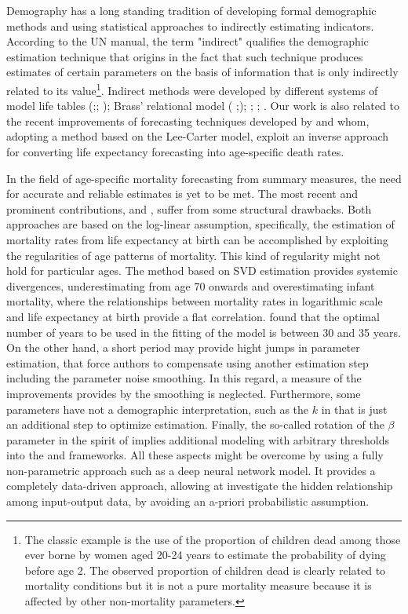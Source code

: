 \documentclass[a4,11pt]{article}
\begin{document}
Demography has a long standing tradition of developing formal demographic methods and using statistical approaches to indirectly estimating indicators. According to the UN manual, the term "indirect" qualifies the demographic estimation technique that origins in the fact that such technique produces estimates of certain parameters on the basis of information that is only indirectly related to its value\footnote{The classic example is the use of the proportion of children dead among those ever borne by women aged 20-24 years to estimate the probability of dying before age 2. The observed proportion of children dead is clearly related to mortality conditions but it is not a pure mortality measure because it is affected by other non-mortality parameters.}. 
Indirect methods were developed by different systems of model life tables (\cite{UN_1955};\cite{UN_1967}; \cite{sullivan1972}); Brass’ relational model ( \cite{brass1968};\cite{brass1971}); \cite{murray2003};  \cite{wilmoth2012}; \cite{mayhew2013}.
Our work is also related to the recent improvements of forecasting techniques developed by \cite{Sevcikova} and  \cite{PascariuLL} whom, adopting a method based on the Lee-Carter model, exploit an inverse approach for converting life expectancy forecasting into age-specific death rates.

In the field of age-specific mortality forecasting from summary measures, the need for accurate and reliable estimates is yet to be met. The most recent and prominent contributions, \cite{Sevcikova} and  \cite{PascariuLL}, suffer from some structural drawbacks. Both approaches are based on the log-linear assumption, specifically, the estimation of mortality rates from life expectancy at birth can be accomplished by exploiting the regularities of age patterns of mortality. This kind of regularity might not hold for particular ages. The \cite{PascariuLL} method based on SVD estimation provides systemic divergences, underestimating from age 70 onwards and overestimating infant mortality, where the relationships between mortality rates in logarithmic scale and life expectancy at birth provide a flat correlation. 
\cite{PascariuLL} found that the optimal number of years to be used in the fitting of the model is between 30 and 35 years. On the other hand, a short period may provide hight jumps in parameter estimation, that force authors to compensate using another estimation step including the parameter noise smoothing. In this regard, a measure of the improvements provides by the smoothing is neglected.
Furthermore, some parameters have not a demographic interpretation, such as the $k$ in \cite{PascariuLL} that is just an additional step to optimize estimation. Finally, the so-called rotation of the $\beta$ parameter in the spirit of \cite{li_13} implies additional modeling with arbitrary thresholds into the \cite{Sevcikova} and \cite{PascariuLL} frameworks.
All these aspects might be overcome by using a fully non-parametric approach such as a deep neural network model. It provides a completely data-driven approach, allowing at investigate the hidden relationship among input-output data, by avoiding an a-priori probabilistic assumption.
\end{document}
